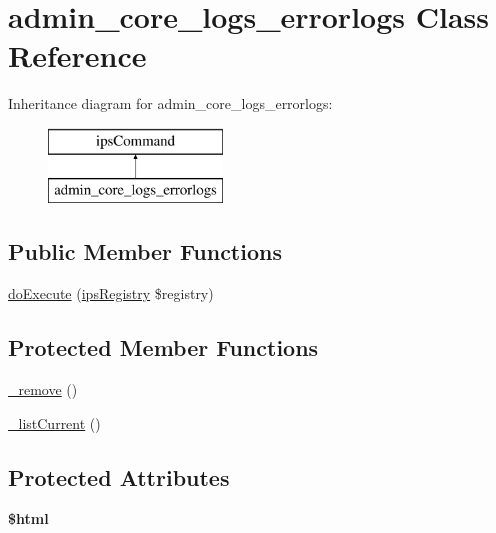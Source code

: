 \hypertarget{classadmin__core__logs__errorlogs}{\section{admin\-\_\-core\-\_\-logs\-\_\-errorlogs Class Reference}
\label{classadmin__core__logs__errorlogs}
}
Inheritance diagram for admin\-\_\-core\-\_\-logs\-\_\-errorlogs\-:\begin{figure}[H]
\begin{center}
\leavevmode
\includegraphics[height=2.000000cm]{classadmin__core__logs__errorlogs}
\end{center}
\end{figure}
\subsection*{Public Member Functions}
\begin{DoxyCompactItemize}
\item 
\hyperlink{classadmin__core__logs__errorlogs_afbc4e912a0604b94d47d66744c64d8ba}{do\-Execute} (\hyperlink{classips_registry}{ips\-Registry} \$registry)
\end{DoxyCompactItemize}
\subsection*{Protected Member Functions}
\begin{DoxyCompactItemize}
\item 
\hyperlink{classadmin__core__logs__errorlogs_a6e3a0c448dcfd8610c6ddf42c6c660aa}{\-\_\-remove} ()
\item 
\hyperlink{classadmin__core__logs__errorlogs_abc03e9ca0857dea04554a012ac374f5a}{\-\_\-list\-Current} ()
\end{DoxyCompactItemize}
\subsection*{Protected Attributes}
\begin{DoxyCompactItemize}
\item 
\hypertarget{classadmin__core__logs__errorlogs_a6f96e7fc92441776c9d1cd3386663b40}{{\bfseries \$html}}\label{classadmin__core__logs__errorlogs_a6f96e7fc92441776c9d1cd3386663b40}

\end{DoxyCompactItemize}
